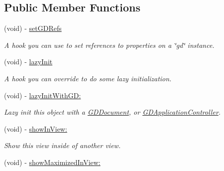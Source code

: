 \subsection*{Public Member Functions}
\begin{DoxyCompactItemize}
\item 
\hypertarget{interface_g_d_base_view_a711eaa2b50c00552ea871775ce48e18a}{
(void) -\/ \hyperlink{interface_g_d_base_view_a711eaa2b50c00552ea871775ce48e18a}{setGDRefs}}
\label{interface_g_d_base_view_a711eaa2b50c00552ea871775ce48e18a}

\begin{DoxyCompactList}\small\item\em A hook you can use to set references to properties on a \char`\"{}gd\char`\"{} instance. \item\end{DoxyCompactList}\item 
(void) -\/ \hyperlink{interface_g_d_base_view_a640709524ac271aad9feda48f742b8fa}{lazyInit}
\begin{DoxyCompactList}\small\item\em A hook you can override to do some lazy initialization. \item\end{DoxyCompactList}\item 
(void) -\/ \hyperlink{interface_g_d_base_view_acadad5bd5ffc83d3c9b34c54461b2f4a}{lazyInitWithGD:}
\begin{DoxyCompactList}\small\item\em Lazy init this object with a \hyperlink{interface_g_d_document}{GDDocument}, or \hyperlink{interface_g_d_application_controller}{GDApplicationController}. \item\end{DoxyCompactList}\item 
(void) -\/ \hyperlink{interface_g_d_base_view_abbf4c6090a17bfd07713de55b0904e0d}{showInView:}
\begin{DoxyCompactList}\small\item\em Show this view inside of another view. \item\end{DoxyCompactList}\item 
\hypertarget{interface_g_d_base_view_a837e3c859782a32d3c7c9270e99dd673}{
(void) -\/ \hyperlink{interface_g_d_base_view_a837e3c859782a32d3c7c9270e99dd673}{showMaximizedInView:}}
\label{interface_g_d_base_view_a837e3c859782a32d3c7c9270e99dd673}


\end{DoxyCompactItemize}
